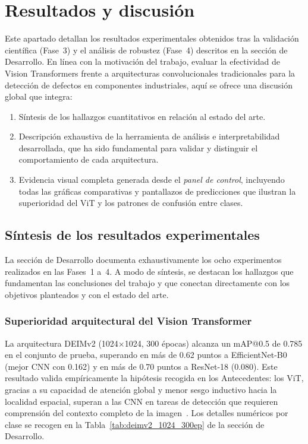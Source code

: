 \chapter{Resultados y discusión}
\label{ch:resultados}

Este apartado detallan los resultados experimentales obtenidos tras la validación científica (Fase~3) y el análisis de robustez (Fase~4) descritos en la sección de Desarrollo. En línea con la motivación del trabajo, evaluar la efectividad de Vision Transformers frente a arquitecturas convolucionales tradicionales para la detección de defectos en componentes industriales, aquí se ofrece una discusión global que integra:
\begin{enumerate}
    \item Síntesis de los hallazgos cuantitativos en relación al estado del arte.
    \item Descripción exhaustiva de la herramienta de análisis e interpretabilidad desarrollada, que ha sido fundamental para validar y distinguir el comportamiento de cada arquitectura.
    \item Evidencia visual completa generada desde el \textit{panel de control}, incluyendo todas las gráficas comparativas y pantallazos de predicciones que ilustran la superioridad del \acrshort{ViT} y los patrones de confusión entre clases.
\end{enumerate}


\section{Síntesis de los resultados experimentales}
\label{sec:sintesis_resultados}

La sección de Desarrollo documenta exhaustivamente los ocho experimentos realizados en las Fases~1 a~4. A modo de síntesis, se destacan los hallazgos que fundamentan las conclusiones del trabajo y que conectan directamente con los objetivos planteados y con el estado del arte.

\subsection{Superioridad arquitectural del Vision Transformer}

La arquitectura DEIMv2 (1024$\times$1024, 300 épocas) alcanza un mAP@0.5 de 0.785 en el conjunto de prueba, superando en más de 0.62 puntos a EfficientNet-B0 (mejor CNN con 0.162) y en más de 0.70 puntos a ResNet-18 (0.080). Este resultado valida empíricamente la hipótesis recogida en los Antecedentes: los \acrshort{ViT}, gracias a su capacidad de atención global y menor sesgo inductivo hacia la localidad espacial, superan a las \acrshort{CNN} en tareas de detección que requieren comprensión del contexto completo de la imagen~\cite{wang2022defect,sudarshan2025object}. Los detalles numéricos por clase se recogen en la Tabla~\ref{tab:deimv2_1024_300ep} de la sección de Desarrollo.

